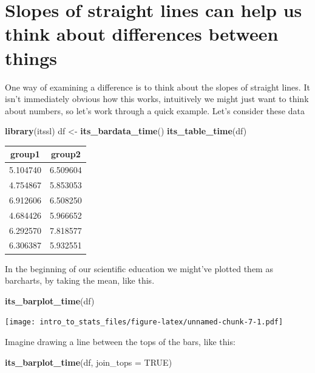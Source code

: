 \documentclass[
]{book}
\newenvironment{Shaded}{\begin{snugshade}}{\end{snugshade}}
\newcommand{\DataTypeTok}[1]{\textcolor[rgb]{0.13,0.29,0.53}{#1}}
\newcommand{\KeywordTok}[1]{\textcolor[rgb]{0.13,0.29,0.53}{\textbf{#1}}}
\newcommand{\NormalTok}[1]{#1}
\newcommand{\OtherTok}[1]{\textcolor[rgb]{0.56,0.35,0.01}{#1}}
\newcommand{\StringTok}[1]{\textcolor[rgb]{0.31,0.60,0.02}{#1}}
\begin{document}
\hypertarget{slopes-of-straight-lines-can-help-us-think-about-differences-between-things}{%
\section{Slopes of straight lines can help us think about differences between things}\label{slopes-of-straight-lines-can-help-us-think-about-differences-between-things}}

One way of examining a difference is to think about the slopes of straight lines. It isn't immediately obvious how this works, intuitively we might just want to think about numbers, so let's work through a quick example. Let's consider these data

\begin{Shaded}
\begin{Highlighting}[]
\KeywordTok{library}\NormalTok{(itssl)}
\NormalTok{df <-}\StringTok{ }\KeywordTok{its_bardata_time}\NormalTok{()}
\KeywordTok{its_table_time}\NormalTok{(df)}
\end{Highlighting}
\end{Shaded}

\begin{tabular}{c|c}
\hline
group1 & group2\\
\hline
5.104740 & 6.509604\\
\hline
4.754867 & 5.853053\\
\hline
6.912606 & 6.508250\\
\hline
4.684426 & 5.966652\\
\hline
6.292570 & 7.818577\\
\hline
6.306387 & 5.932551\\
\hline
\end{tabular}

In the beginning of our scientific education we might've plotted them as barcharts, by taking the mean, like this.

\begin{Shaded}
\begin{Highlighting}[]
\KeywordTok{its_barplot_time}\NormalTok{(df)}
\end{Highlighting}
\end{Shaded}

\texttt{[image: intro\_to\_stats\_files/figure-latex/unnamed-chunk-7-1.pdf]}

Imagine drawing a line between the tops of the bars, like this:

\begin{Shaded}
\begin{Highlighting}[]
\KeywordTok{its_barplot_time}\NormalTok{(df, }\DataTypeTok{join_tops =} \OtherTok{TRUE}\NormalTok{)}
\end{Highlighting}
\end{Shaded}
\end{document}
